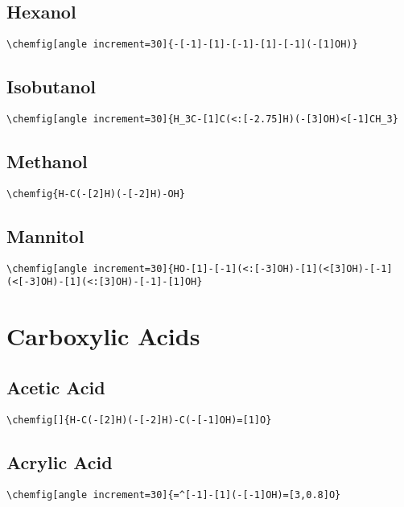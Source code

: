 \section{Hexanol}\label{app:hexanol}
\begin{lstlisting}
\chemfig[angle increment=30]{-[-1]-[1]-[-1]-[1]-[-1](-[1]OH)}
\end{lstlisting}

\section{Isobutanol}\label{app:isobutanol}
\begin{lstlisting}
\chemfig[angle increment=30]{H_3C-[1]C(<:[-2.75]H)(-[3]OH)<[-1]CH_3}
\end{lstlisting}

\section{Methanol}\label{app:methanol}
\begin{lstlisting}
\chemfig{H-C(-[2]H)(-[-2]H)-OH}
\end{lstlisting}

\section{Mannitol}\label{app:mannitol}
\begin{lstlisting}
\chemfig[angle increment=30]{HO-[1]-[-1](<:[-3]OH)-[1](<[3]OH)-[-1](<[-3]OH)-[1](<:[3]OH)-[-1]-[1]OH}
\end{lstlisting}



\chapter{Carboxylic Acids}\label{app:carboxylic-acids}


\section{Acetic Acid}\label{app:acetic-acid}
\begin{lstlisting}
\chemfig[]{H-C(-[2]H)(-[-2]H)-C(-[-1]OH)=[1]O}
\end{lstlisting}


\section{Acrylic Acid}\label{app:acrylic-acid}
\begin{lstlisting}
\chemfig[angle increment=30]{=^[-1]-[1](-[-1]OH)=[3,0.8]O}
\end{lstlisting}


